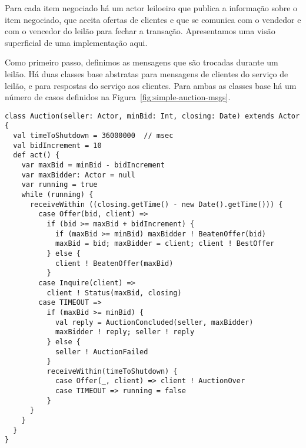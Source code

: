 Para cada item negociado h\'{a} um actor leiloeiro que publica a 
informa\c{c}\~{a}o sobre o item negociado, que aceita ofertas de clientes
e que se comunica com o vendedor e com o vencedor do leil\~{a}o 
para fechar a transa\c{c}\~{a}o. Apresentamos uma vis\~{a}o superficial de uma
 implementa\c{c}\~{a}o aqui.

Como primeiro passo, definimos as mensagens que s\~{a}o trocadas durante um
leil\~{a}o. H\'{a} duas classes base abstratas  para mensagens 
de clientes do servi\c{c}o de leil\~{a}o, e  para respostas 
do servi\c{c}o aos clientes. Para ambas as classes base h\'{a} um n\'{u}mero de casos 
definidos na Figura~\ref{fig:simple-auction-msgs}.

\begin{lstlisting}[style=floating,label=fig:simple-auction,caption=Implementation of an Auction Service]
class Auction(seller: Actor, minBid: Int, closing: Date) extends Actor {
  val timeToShutdown = 36000000  // msec
  val bidIncrement = 10
  def act() {
    var maxBid = minBid - bidIncrement
    var maxBidder: Actor = null
    var running = true
    while (running) {
      receiveWithin ((closing.getTime() - new Date().getTime())) {
        case Offer(bid, client) =>
          if (bid >= maxBid + bidIncrement) { 
            if (maxBid >= minBid) maxBidder ! BeatenOffer(bid)
            maxBid = bid; maxBidder = client; client ! BestOffer
          } else {
            client ! BeatenOffer(maxBid)
          }
        case Inquire(client) =>
          client ! Status(maxBid, closing)
        case TIMEOUT =>
          if (maxBid >= minBid) {
            val reply = AuctionConcluded(seller, maxBidder)
            maxBidder ! reply; seller ! reply
          } else {
            seller ! AuctionFailed
          }
          receiveWithin(timeToShutdown) {
            case Offer(_, client) => client ! AuctionOver
            case TIMEOUT => running = false
          }
      }
    }
  } 
}
\end{lstlisting}

